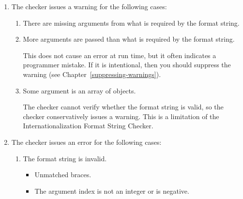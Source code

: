 \begin{enumerate}
  \item{The checker issues a warning for the following cases:}
    \begin{enumerate}
      \item There are missing arguments from what is required by the format string.


      \item More arguments are passed than what is required by the format string.



      This does not cause an error at run time, but it often indicates a
      programmer mistake.  If it is intentional, then you should suppress
      the warning (see Chapter~\ref{suppressing-warnings}).

      \item Some argument is an array of objects.


      The checker cannot verify whether the format string is valid, so
      the checker conservatively issues a warning.  This is a limitation of
      the Internationalization Format String Checker.

    \end{enumerate}
  \item The checker issues an error for the following cases:
    \begin{enumerate}
      \item The format string is invalid.

        \begin{itemize}
          \item Unmatched braces.


          \item The argument index is not an integer or is negative.




\end{itemize}
\end{enumerate}
\end{enumerate}
